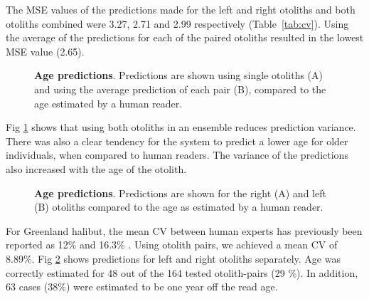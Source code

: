 \documentclass[10pt,letterpaper]{article}
\begin{document}
The MSE values of the predictions made for the left and right otoliths and both otoliths combined were 3.27, 2.71 and 2.99 respectively (Table~\ref{tab:cv}). Using the average of the predictions for each of the paired otoliths resulted in the lowest MSE value (2.65).

\begin{figure}[H]
	\centering
    \caption{\textbf{Age predictions}. Predictions are shown using single otoliths (A) and using the average prediction of each pair (B), compared to the age estimated by a human reader.}
    \label{fig:single_pairs}
\end{figure}

Fig \ref{fig:single_pairs} shows that using both otoliths in an ensemble reduces prediction variance. There was also a clear tendency for the system to predict a lower age for older individuals, when compared to human readers. The variance of the predictions also increased with the age of the otolith.

\begin{figure}[H]
	\centering
    \caption{\textbf{Age predictions}. Predictions are shown for the right (A) and left (B) otoliths compared to the age as estimated by a human reader.}
    \label{fig:left_and_right_vs_human}
\end{figure}  

For Greenland halibut, the mean CV between human experts has previously been reported as 12\% and 16.3\% \citep{albert2009towards,albert2016growth}. Using otolith pairs, we achieved a mean CV of 8.89\%. Fig \ref{fig:left_and_right_vs_human} shows predictions for left and right otoliths separately. Age was correctly estimated for 48 out of the 164 tested otolith-pairs (29 \%). In  addition, 63 cases (38\%) were estimated to be one year off the read age.

\end{document}
